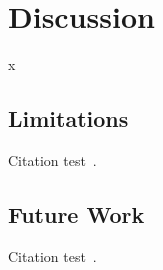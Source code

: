 
\chapter{Discussion}\label{chapter:discussion}
x

\section{Limitations}
Citation test~\parencite{latex}.

\section{Future Work}\label{section:future_work}
Citation test~\parencite{latex}.
